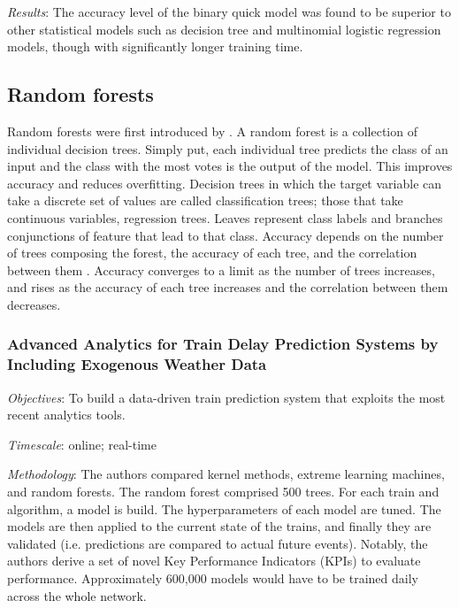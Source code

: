 \documentclass{article}
\begin{document}
\smallskip

\textit{Results}: The accuracy level of the binary quick model was found to be superior to other statistical models such as decision tree and multinomial logistic regression models, though with significantly longer training time.

\subsection{Random forests}
 
Random forests were first introduced by \cite{ho_1995}. A random forest is a collection of individual decision trees. Simply put, each individual tree predicts the class of an input and the class with the most votes is the output of the model. This improves accuracy and reduces overfitting. Decision trees in which the target variable can take a discrete set of values are called classification trees; those that take continuous variables, regression trees. Leaves represent class labels and branches conjunctions of feature that lead to that class. Accuracy depends on the number of trees composing the forest,  the accuracy of each tree, and the correlation between them \cite{breiman_2001}. Accuracy converges to a limit as the number of trees increases, and rises as the accuracy of each tree increases and the correlation between them decreases.

\subsubsection{Advanced Analytics for Train Delay Prediction Systems by Including Exogenous Weather Data \cite{oneto_et_al_2016}}

\textit{Objectives}: To build a data-driven train prediction system that exploits the most recent analytics tools.

\smallskip

\textit{Timescale}: online; real-time

\smallskip

\textit{Methodology}: The authors compared kernel methods, extreme learning machines, and random forests. The random forest comprised 500 trees. For each train and algorithm, a model is build. The hyperparameters of each model are tuned. The models are then applied to the current state of the trains, and finally they are validated (i.e. predictions are compared to actual future events). Notably, the authors derive a set of novel Key Performance Indicators (KPIs) to evaluate performance. Approximately 600,000 models would have to be trained daily across the whole network.
\end{document}
